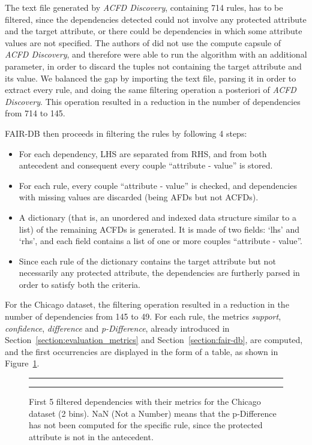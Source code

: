 \begin{itemize}
The text file generated by \textit{ACFD Discovery}, containing 714 rules, has to be filtered, since the dependencies detected could not involve any protected attribute and the target attribute, or there could be dependencies in which some attribute values are not specified. The authors of \cite{azzalini2021fair} did not use the compute capsule of \textit{ACFD Discovery}, and therefore were able to run the algorithm with an additional parameter, in order to discard the tuples not containing the target attribute and its value. We balanced the gap by importing the text file, parsing it in order to extract every rule, and doing the same filtering operation a posteriori of \textit{ACFD Discovery}. This operation resulted in a reduction in the number of dependencies from 714 to 145.

FAIR-DB then proceeds in filtering the rules by following 4 steps:
\begin{itemize}
\item[1.] For each dependency, LHS are separated from RHS, and from both antecedent and consequent every couple ``attribute - value'' is stored.
\item[2.] For each rule, every couple ``attribute - value'' is checked, and dependencies with missing values are discarded (being AFDs but not ACFDs).
\item[3.] A dictionary (that is, an unordered and indexed data structure similar to a list) of the remaining ACFDs is generated. It is made of two fields: `lhs' and `rhs', and each field contains a list of one or more couples ``attribute - value''.
\item[4.] Since each rule of the dictionary contains the target attribute but not necessarily any protected attribute, the dependencies are furtherly parsed in order to satisfy both the criteria.
\end{itemize}

For the Chicago dataset, the filtering operation resulted in a reduction in the number of dependencies from 145 to 49. For each rule, the metrics \textit{support}, \textit{confidence}, \textit{difference} and \textit{p-Difference}, already introduced in Section~\ref{section:evaluation_metrics} and Section~\ref{section:fair-db}, are computed, and the first occurrencies are displayed in the form of a table, as shown in Figure~\ref{fig:chicago_fair-db4}.

\begin{figure}[h!]
\centering
\noindent\rule{\linewidth}{0.4pt}\par
\noindent\rule{\linewidth}{0.4pt}
\caption{First 5 filtered dependencies with their metrics for the Chicago dataset (2 bins). NaN (Not a Number) means that the p-Difference has not been computed for the specific rule, since the protected attribute is not in the antecedent.}
\label{fig:chicago_fair-db4}
\end{figure}


\end{itemize}
